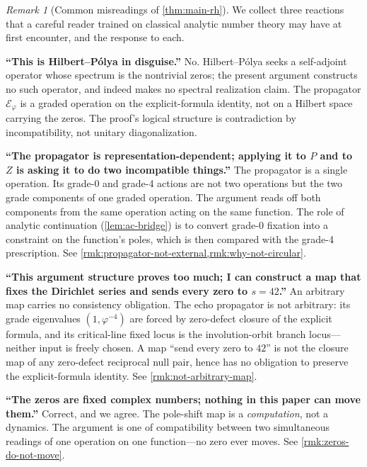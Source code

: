 \documentclass[11pt,a4paper]{article}
\theoremstyle{plain}
\theoremstyle{definition}
\theoremstyle{remark}
\newtheorem{remark}[theorem]{Remark}
\numberwithin{equation}{section}
\newcommand{\vp}{\varphi}
\begin{document}
\begin{remark}[Common misreadings of \cref{thm:main-rh}]
\label{rmk:common-misreadings}
We collect three reactions that a careful reader trained on
classical analytic number theory may have at first encounter, and
the response to each.

\smallskip\noindent\textbf{``This is Hilbert--P\'olya in disguise.''}
\quad No.  Hilbert--P\'olya seeks a self-adjoint operator whose
spectrum is the nontrivial zeros; the present argument constructs
no such operator, and indeed makes no spectral realization claim.
The propagator \(\mathcal{E}_\vp\) is a graded operation on the
explicit-formula identity, not on a Hilbert space carrying the
zeros.  The proof's logical structure is contradiction by
incompatibility, not unitary diagonalization.

\smallskip\noindent\textbf{``The propagator is representation-dependent;
applying it to \(P\) and to \(Z\) is asking it to do two
incompatible things.''}
\quad The propagator is a single operation.  Its grade-0 and
grade-4 actions are not two operations but the two grade
components of one graded operation.  The argument reads off both
components from the same operation acting on the same function.
The role of analytic continuation (\cref{lem:ac-bridge}) is to
convert grade-0 fixation into a constraint on the function's
poles, which is then compared with the grade-4 prescription.
See \cref{rmk:propagator-not-external,rmk:why-not-circular}.

\smallskip\noindent\textbf{``This argument structure proves too
much; I can construct a map that fixes the Dirichlet series and
sends every zero to \(s=42\).''}
\quad An arbitrary map carries no consistency obligation.  The
echo propagator is not arbitrary: its grade eigenvalues
\((1,\vp^{-4})\) are forced by zero-defect closure of the
explicit formula, and its critical-line fixed locus is the
involution-orbit branch locus---neither input is freely chosen.
A map ``send every zero to \(42\)'' is not the closure map of any
zero-defect reciprocal null pair, hence has no obligation to
preserve the explicit-formula identity.  See
\cref{rmk:not-arbitrary-map}.

\smallskip\noindent\textbf{``The zeros are fixed complex numbers;
nothing in this paper can move them.''}
\quad Correct, and we agree.  The pole-shift map is a
\emph{computation}, not a dynamics.  The argument is one of
compatibility between two simultaneous readings of one operation
on one function---no zero ever moves.  See
\cref{rmk:zeros-do-not-move}.
\end{remark}
\end{document}
